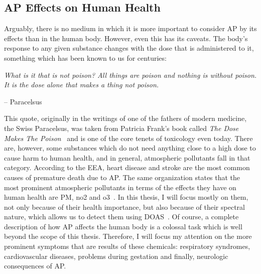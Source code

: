 

\subsection{\acrlong{AP} Effects on Human Health}%
\label{sub:ap_effects_on_human_health}

Arguably, there is no medium in which it is more important to consider
\gls{AP} by its effects than in the human body. However, even this has
its caveats. The body's response to any given substance changes with the
dose that is administered to it, something which has been known to us
for centuries:

\begin{flushright}
    \begin{minipage}{0.8\textwidth}
        \noindent
        \textit{
            What is it that is not poison? All things are poison and
            nothing is without poison. It is the dose alone that makes a
            thing not poison.
        }

        \hfill-- Paracelsus
    \end{minipage}
\end{flushright}

This quote, originally in the writings of one of the fathers of modern
medicine, the Swiss Paracelsus, was taken from Patricia Frank's book
called \emph{The Dose Makes The Poison}~\cite{Frank2011} and is one of
the core tenets of toxicology even today. There are, however, some
substances which do not need anything close to a high dose to cause harm
to human health, and in general, atmospheric pollutants fall in that
category. According to the \gls{EEA}, heart disease and stroke are the
most common causes of premature death due to \acrlong{AP}. The same
organization states that the most prominent atmospheric pollutants in
terms of the effects they have on human health are \gls{PM}, \gls{no2}
and \gls{o3}~\cite{EEA2016, EEA2007}. In this thesis, I will focus
mostly on them, not only because of their health importance, but also
because of their spectral nature, which allows us to detect them using
\gls{DOAS}~\cite{Platt2007}. Of course, a complete description of how
\gls{AP} affects the human body is a colossal task which is well beyond
the scope of this thesis.  Therefore, I will focus my attention on the
more prominent symptoms that are results of these chemicals: respiratory
syndromes, cardiovascular diseases, problems during gestation and
finally, neurologic consequences of \gls{AP}.

